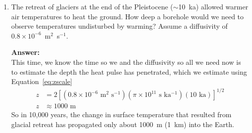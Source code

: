 \begin{enumerate}
    \item The retreat of glaciers at the end of the Pleistocene
    ($\sim$10~ka) allowed warmer air temperatures to heat the ground.  How
    deep a borehole would we need to observe temperatures undisturbed by
    warming? Assume a diffusivity of $0.8 \times 10^{-6}$~m$^2$~s$^{-1}$.

    {\bf Answer:} \\
    This time, we know the time so we and the diffusivity so all we need now
    is to estimate the depth the heat pulse has penetrated, which we
    estimate using Equation~\ref{eq:zscale}
    \begin{align*}
        z &= 2 [(0.8 \times 10^{-6} \text{ m$^{2}$~s$^{-1}$})(\pi \times
        10^{11} \text{ s ka$^{-1}$})(10 \text{ ka})]^{1/2} \\
        z &\approx 1000 \text{ m}
    \end{align*}
    So in 10,000 years, the change in surface temperature that resulted from
    glacial retreat has propagated only about 1000~m (1~km) into the Earth.
\end{enumerate}

